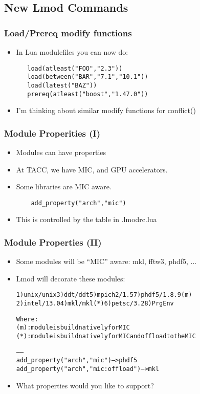 \documentclass{beamer}
\begin{document}
\subsection{New Lmod Commands}
\label{sec:cmds}

\begin{frame}[fragile]
    \frametitle{Load/Prereq modify functions}
  \begin{itemize}
    \item In Lua modulefiles you can now do:
    {\small
\begin{verbatim}
   load(atleast("FOO","2.3"))
   load(between("BAR","7.1","10.1"))
   load(latest("BAZ"))
   prereq(atleast("boost","1.47.0"))
\end{verbatim}
}
    \item I'm thinking about similar modify functions for conflict()
  \end{itemize}
\end{frame}

\begin{frame}[fragile]
    \frametitle{Module Properities (I)}
  \begin{itemize}
    \item Modules can have properties
    \item At TACC, we have MIC, and GPU accelerators.
    \item Some libraries are MIC aware.
    {\small
\begin{verbatim}
    add_property("arch","mic")
\end{verbatim}
}
    \item This is controlled by the table in .lmodrc.lua
  \end{itemize}
\end{frame}

\begin{frame}[fragile]
    \frametitle{Module Properties (II)}
  \begin{itemize}
    \item Some modules will be ``MIC'' aware: mkl, fftw3, phdf5, ...
    \item Lmod will decorate these modules:
  {\tiny
    \begin{alltt}
  1) unix/unix     3) ddt/ddt       5) mpich2/1.5    7) {\color{blue}phdf5/1.8.9 (m)}
  2) intel/13.0    4) {\color{red}mkl/mkl (*)}   6) petsc/3.2     8) PrgEnv

  Where:
   {\color{blue}(m)}:  module is build natively for MIC
   {\color{red}(*)}:  module is build natively for MIC and offload to the MIC

   ------
   add_property("arch","mic")              -- > phdf5
   add_property("arch","mic:offload")      -- > mkl
    \end{alltt}
}
  \item What properties would you like to support?
  \end{itemize}
\end{frame}
\end{document}
